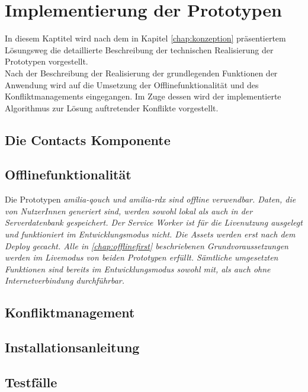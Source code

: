 \chapter{\label{chap:implementierung}Implementierung der Prototypen}
In diesem Kaptitel wird nach dem in Kapitel \ref{chap:konzeption} präsentiertem Lösungsweg die detaillierte Beschreibung der technischen Realisierung der Prototypen vorgestellt.\\
Nach der Beschreibung der Realisierung der grundlegenden Funktionen der Anwendung wird auf die Umsetzung der Offlinefunktionalität und des Konfliktmanagements eingegangen.
Im Zuge dessen wird der implementierte Algorithmus zur Lösung auftretender Konflikte vorgestellt.
%
%
%
\section{Die Contacts Komponente}

%
%
%
\section{Offlinefunktionalität}
Die Prototypen \it{amilia-qouch} und \it{amilia-rdx} sind offline verwendbar.
Daten, die von NutzerInnen generiert sind, werden sowohl lokal als auch in der Serverdatenbank gespeichert.
Der Service Worker ist für die Livenutzung ausgelegt und funktioniert im Entwicklungsmodus nicht. Die \gls{Assets} werden erst nach dem Deploy gecacht.
Alle in \autoref{chap:offlinefirst} beschriebenen Grundvoraussetzungen werden im Livemodus von beiden Prototypen erfüllt.
Sämtliche umgesetzten Funktionen sind bereits im Entwicklungsmodus sowohl mit, als auch ohne Internetverbindung durchführbar.
%

%
%
%
\section{\label{chap:konfliktmanagement}Konfliktmanagement}

%
%
\section{Installationsanleitung}


%
%
\section{\label{chap:impl:test}Testfälle}
